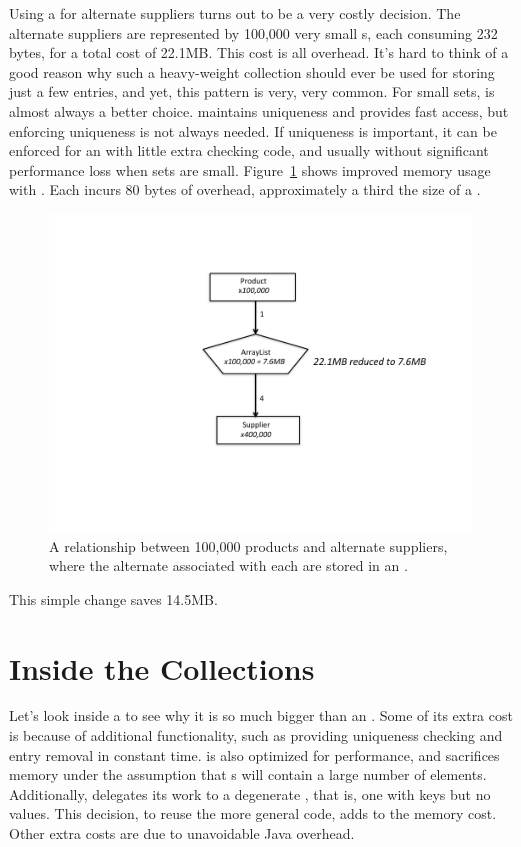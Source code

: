 Using a  for alternate suppliers turns out to be a
very costly decision. The alternate suppliers are represented by 100,000
very small s, each consuming 232 bytes, for a total cost of 22.1MB. 
This cost is all overhead.
It's hard to think of a good reason why such a heavy-weight collection should ever be used
 for storing just a few entries, and yet, this pattern is very, very common. For
 small sets,  is almost always a better choice.  maintains uniqueness
  and provides fast access, but enforcing uniqueness
is not always needed. If uniqueness is
important, it can be enforced for an  
 with  little extra checking code, and usually without significant performance
 loss when sets are small. Figure~\ref{fig:product-arraylist} shows improved
 memory usage with . Each  incurs 80 bytes of overhead,
approximately a third the size of a .
 \begin{figure}
  \centering
 \includegraphics[width=.80\textwidth]{part1/Figures/collections/product-arraylist.pdf}
 \caption{A relationship between 100,000 products and alternate suppliers,
 where the alternate  associated with each  are
 stored in an .}
  \label{fig:product-arraylist}
\end{figure}
This simple change saves 14.5MB. 


\section{Inside the Collections}
\label{sec:collectioncost}
Let's look inside a  to see why it is so much bigger than an
. Some of its extra cost is because of additional functionality,
such as providing uniqueness checking and entry removal in constant time.
 is also optimized for performance, and sacrifices memory 
under the assumption that s will contain a large number of
elements. Additionally,  delegates its work to a
degenerate , that is, one with keys but no values. This decision,
to reuse the more general  code, adds to the memory
cost. Other extra costs are due to unavoidable Java overhead.

